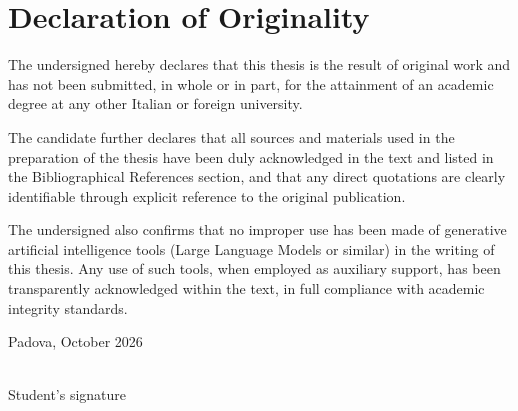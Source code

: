 \chapter*{Declaration of Originality}

The undersigned hereby declares that this thesis is the result of original
work and has not been submitted, in whole or in part, for the attainment of
an academic degree at any other Italian or foreign university.

The candidate further declares that all sources and materials used in the
preparation of the thesis have been duly acknowledged in the text and
listed in the Bibliographical References section, and that any direct
quotations are clearly identifiable through explicit reference to the
original publication.

The undersigned also confirms that no improper use has been made of
generative artificial intelligence tools (Large Language Models or
similar) in the writing of this thesis. Any use of such tools, when
employed as auxiliary support, has been transparently acknowledged within
the text, in full compliance with academic integrity standards.

\vspace{6em}

\noindent Padova, October 2026

\vspace{4em}

\noindent\makebox[7cm]{\hrulefill} \\
\noindent Student's signature

